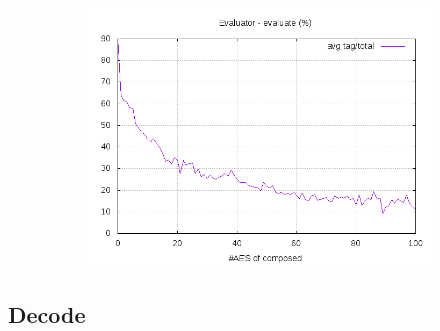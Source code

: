 \documentclass[10pt,a4paper]{article}
\begin{document}
\begin{figure}[h]
\begin{subfigure}[t]{0.3\textwidth}
        \includegraphics[width=\textwidth]{eval_eval_frac}
        \caption{}
    \end{subfigure}
\end{figure}

\subsection{Decode}
\end{document}
